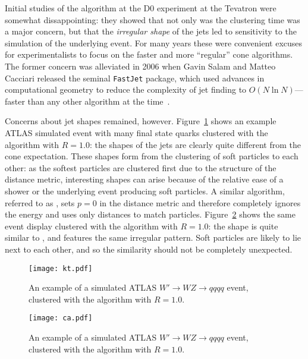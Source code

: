 Initial studies of the \kt algorithm at the D0 experiment at the Tevatron were somewhat dissappointing: they showed that not only was the clustering time was a major concern, but that the \textit{irregular shape} of the \kt jets led to sensitivity to the simulation of the underlying event. For many years these were convenient excuses for experimentalists to focus on the faster and more ``regular'' cone algorithms. The former concern was alleviated in 2006 when Gavin Salam and Matteo Cacciari released the seminal \texttt{FastJet} package, which used advances in computational geometry to reduce the complexity of \kt jet finding to $O(N \ln N)$--- faster than any other algorithm at the time~\cite{fj}. 

Concerns about jet shapes remained, however. Figure~\ref{fig:jets:kt} shows an example ATLAS simulated event with many final state quarks clustered with the \kt algorithm with $R=1.0$: the shapes of the jets are clearly quite different from the cone expectation. These shapes form from the clustering of soft particles to each other: as the softest particles are clustered first due to the structure of the distance metric, interesting shapes can arise because of the relative ease of a shower or the underlying event producing soft particles. A similar algorithm, referred to as \CA, sets $p=0$ in the distance metric and therefore completely ignores the energy and uses only distances to match particles. Figure~\ref{fig:jets:ca} shows the same event display clustered with the \CA algorithm with $R=1.0$: the shape is quite similar to \kt, and features the same irregular pattern. Soft particles are likely to lie next to each other, and so the similarity should not be completely unexpected.  %


\begin{figure}
\centering
\texttt{[image: kt.pdf]}
\caption{An example of a simulated ATLAS $W'\rightarrow WZ\rightarrow qqqq$ event, clustered with the \kt algorithm with $R=1.0$.}
\label{fig:jets:kt}
\end{figure}



\begin{figure}
\centering
\texttt{[image: ca.pdf]}
\caption{An example of a simulated ATLAS $W'\rightarrow WZ\rightarrow qqqq$ event, clustered with the \CA algorithm with $R=1.0$.}
\label{fig:jets:ca}
\end{figure}

